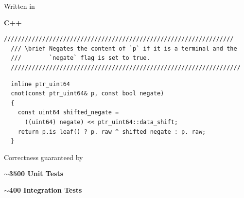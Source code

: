 \documentclass[english, aspectratio=169]{beamer}
\begin{document}
\begin{frame}
  \begin{figure}
    \centering

    \begin{tikzpicture}
      
    \end{tikzpicture}
  \end{figure}
\end{frame}

\begin{frame}
  \begin{center}
    {\LARGE Written in}

    \medskip

    {\fontsize{42}{50}\selectfont \textbf{C++}}
  \end{center}
\end{frame}

\begin{frame}
  \begin{lstlisting}[numbers=none]
  //////////////////////////////////////////////////////////////////
  /// \brief Negates the content of `p` if it is a terminal and the
  ///        `negate` flag is set to true.
  //////////////////////////////////////////////////////////////////
  \end{lstlisting}
  \begin{lstlisting}
  inline ptr_uint64
  cnot(const ptr_uint64& p, const bool negate)
  {
    const uint64 shifted_negate =
      ((uint64) negate) << ptr_uint64::data_shift;
    return p.is_leaf() ? p._raw ^ shifted_negate : p._raw;
  }
  \end{lstlisting}
\end{frame}

\begin{frame}
  \begin{center}
    {\LARGE Correctness guaranteed by}

    {\Huge
      \textbf{$\sim$3500 Unit Tests}

      \bigskip

      \textbf{$\sim$400 Integration Tests}
    }
  \end{center}
\end{frame}

\blankframe
\end{document}
